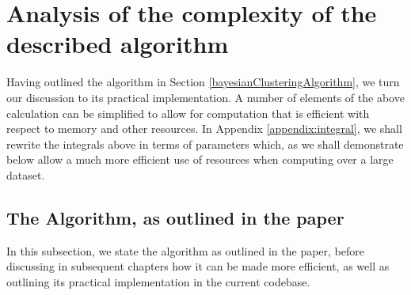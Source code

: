 \documentclass[11pt]{article}
\begin{document}

\section{Analysis of the complexity of the described algorithm}


Having outlined the algorithm in Section \ref{bayesianClusteringAlgorithm}, we turn our discussion to its practical implementation. A number of elements of the above calculation can be simplified to allow for computation that is efficient with respect to memory and other resources. In Appendix \ref{appendix:integral}, we shall rewrite the integrals above in terms of parameters which, as we shall demonstrate below allow a much more efficient use of resources when computing over a large dataset.\\


\subsection{The Algorithm, as outlined in the paper}


In this subsection, we state the algorithm as outlined in the paper, before discussing in subsequent chapters how it can be made more efficient, as well as outlining its practical implementation in the current codebase.\\
\end{document}
